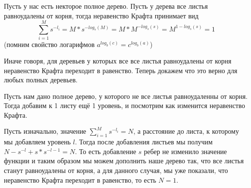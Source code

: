 \documentclass[../main.tex]{subfiles}
\begin{document}
   Пусть у нас есть некторое полное дерево. Пусть у дерева все листья равноудалены от корня, тогда неравенство Крафта принимает вид 
   $$\sum\limits_{i=1}^{M}s^{-l_i} = M*s^{-log_s(M)} = M*M^{-log_s(s)} = M^{1-log_s(s)} = 1 $$ 
   (помним свойство логарифмов $a^{log_b(c)}=c^{log_b(a)}$)
   
   Иначе говоря, для деревьев у которых все все листья равноудалены от корня неравенство Крафта переходит в равенство. Теперь докажем что это верно для любых полных деревьев.
   
   Пусть нам дано полное дерево, у которого не все листья равноудаленны от корня. Тогда добавим к 1 листу ещё 1 уровень, и посмотрим как изменится неравенство Крафта.
   
   Пусть изначально, значение $\sum\limits_{i=1}^{M}s^{-l_i}=N$, а расстояние до листа, к которому мы добавляем \newline уровень $l$. Тогда после добавления листьев мы получим $N-s^{-l} + s*s^{-l-1} = N$. То есть добавление $s$ ребер не изменило значение функции и таким образом мы можем дополнить наше дерево так, что все листья станут равноудалены от корня, а для данного случая, мы уже показали, что неравенство Крафта переходит в равенство, то есть $N=1$.
\end{document}
